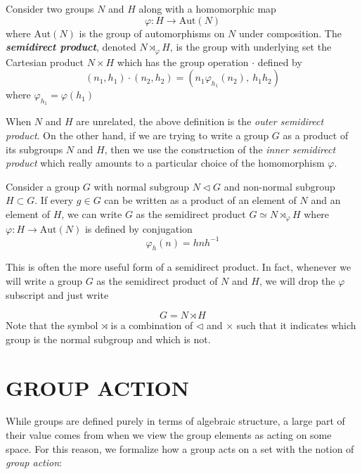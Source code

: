 \documentclass[9 pt]{report}
\begin{document}
\begin{tcolorbox}
	Consider two groups $N$ and $H$ along with a homomorphic map 
	$$ \varphi : H\to \text{Aut}(N)$$
	where $\text{Aut}(N)$ is the group of automorphisms on $N$ under composition. The \textbf{\emph{semidirect product}}, denoted $N\rtimes_\varphi H$, is the group with underlying set the Cartesian product $N\times H$ which has the group operation $\cdot$ defined by
	$$ (n_1, h_1)\cdot(n_2, h_2) = \left(n_1 \varphi_{h_1}(n_2), \:h_1h_2 \right) $$
	where $\varphi_{h_1}=\varphi(h_1)$
\end{tcolorbox}
When $N$ and $H$ are unrelated, the above definition is the \emph{outer semidirect product}. On the other hand, if we are trying to write a group $G$ as a product of its subgroups $N$ and $H$, then we use the construction of the \emph{inner semidirect product} which really amounts to a particular choice of the homomorphism $\varphi$. 

\begin{tcolorbox}
	Consider a group $G$ with normal subgroup $N\triangleleft G$ and non-normal subgroup $H \subset G$. If every $g\in G$ can be written as a product of an element of $N$ and an element of $H$, we can write $G$ as the semidirect product $G\simeq N\rtimes_\varphi H$ where $\varphi:H\to\text{Aut}(N)$ is defined by conjugation
	$$ \varphi_{h}(n) = h n  h^{-1} $$
\end{tcolorbox}
This is often the more useful form of a semidirect product. In fact, whenever we will write a group $G$ as the semidirect product of $N$ and $H$, we will drop the $\varphi$ subscript and just write 

$$ G = N \rtimes H $$
Note that the symbol $\rtimes$ is a combination of $\triangleleft$ and $\times$ such that it indicates which group is the normal subgroup and which is not.

\newpage


{\centering
\section*{GROUP ACTION}}
While groups are defined purely in terms of algebraic structure, a large part of their value comes from when we view the group elements as acting on some space. For this reason, we formalize how a group acts on a set with the notion of \emph{group action}:
\end{document}
